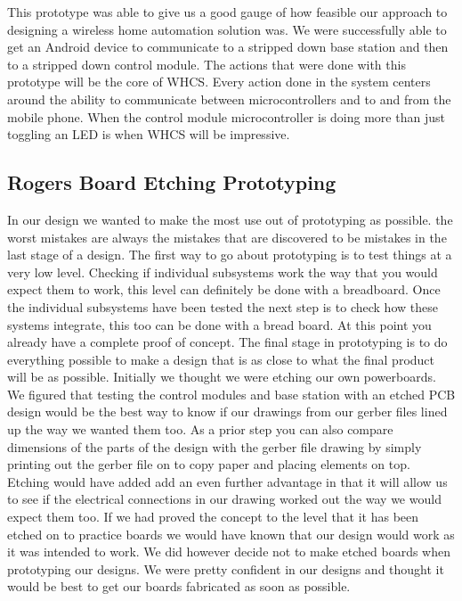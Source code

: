 This prototype was able to give us a good gauge of how feasible
our approach to designing a wireless home automation solution was. We were 
successfully able to get an Android device to communicate to a stripped down
base station and then to a stripped down control module. The actions that were
done with this prototype will be the core of WHCS. Every action done in the
system centers around the ability to communicate between microcontrollers and
to and from the mobile phone.  When the control module microcontroller is doing
more than just toggling an LED is when WHCS will be impressive.

\subsection{Rogers Board Etching Prototyping}
In our design we wanted to make the most use out of prototyping as possible.
the worst mistakes are always the mistakes that are discovered to be mistakes
in the last stage of a design. The first way to go about prototyping is to test
things at a very low level. Checking if individual subsystems work the way that
you would expect them to work, this level can definitely be done with a
breadboard. Once the individual subsystems have been tested the next step is to
check how these systems integrate, this too can be done with a bread board. At
this point you already have a complete proof of concept. The final stage in
prototyping is to do everything possible to make a design that is as close to
what the final product will be as possible. Initially we thought we were etching our own powerboards. We figured that testing the control
modules and base station with an etched PCB design would be the best way to
know if our drawings from our gerber files lined up the way we wanted them too.
As a prior step you can also compare dimensions of the parts of the design with
the gerber file drawing by simply printing out the gerber file on to copy paper
and placing elements on top. Etching would have added add an even further advantage
in that it will allow us to see if the electrical connections in our drawing
worked out the way we would expect them too. If we had proved the concept to
the level that it has been etched on to practice boards we would have known that our design
would work as it was intended to work. We did however decide not to make etched boards when prototyping our designs. We were pretty confident in our designs and thought it would be best to get our boards fabricated as soon as possible.

